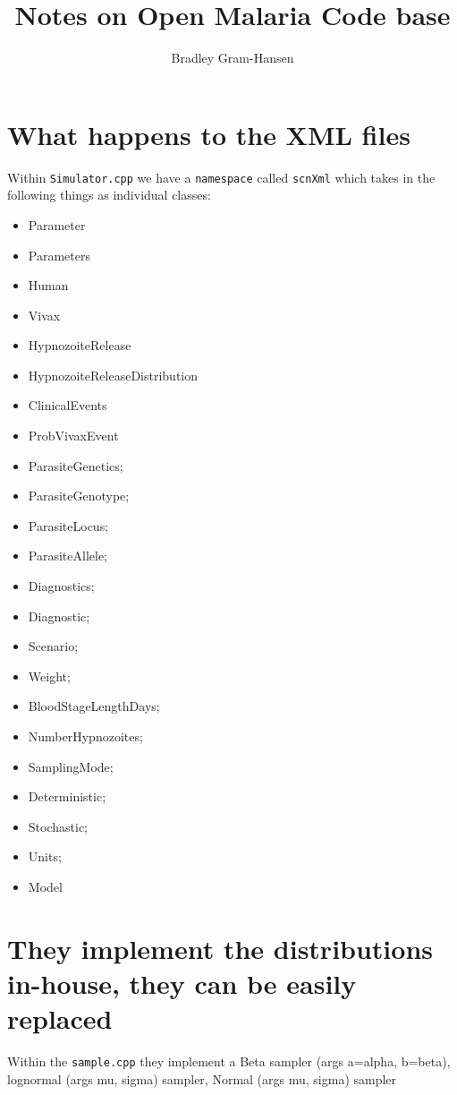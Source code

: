 \documentclass[]{scrartcl}
\title{Notes on Open Malaria Code base}
\author{Bradley Gram-Hansen}
\begin{document}
\maketitle

\begin{abstract}

\end{abstract}

\section{What happens to the XML files}

Within \texttt{Simulator.cpp} we have a \texttt{namespace} called  \texttt{scnXml} which takes in the following things as individual classes:
\begin{itemize}
	\item Parameter
	\item Parameters
	\item Human
	\item Vivax
	\item HypnozoiteRelease
	\item HypnozoiteReleaseDistribution
	\item ClinicalEvents
	\item ProbVivaxEvent
	\item ParasiteGenetics;
	\item ParasiteGenotype;
	\item ParasiteLocus;
	\item ParasiteAllele;
	\item Diagnostics;
	\item Diagnostic;
	\item Scenario;
	\item Weight;
	\item BloodStageLengthDays;
	\item NumberHypnozoites;
	\item SamplingMode;
	\item Deterministic;
	\item Stochastic;
	\item Units;
	\item Model
\end{itemize}

\section{They implement the distributions in-house, they can be easily replaced}

Within the \texttt{sample.cpp} they implement a Beta sampler (args a=alpha, b=beta), lognormal (args mu, sigma) sampler, Normal (args mu, sigma) sampler
\end{document}
